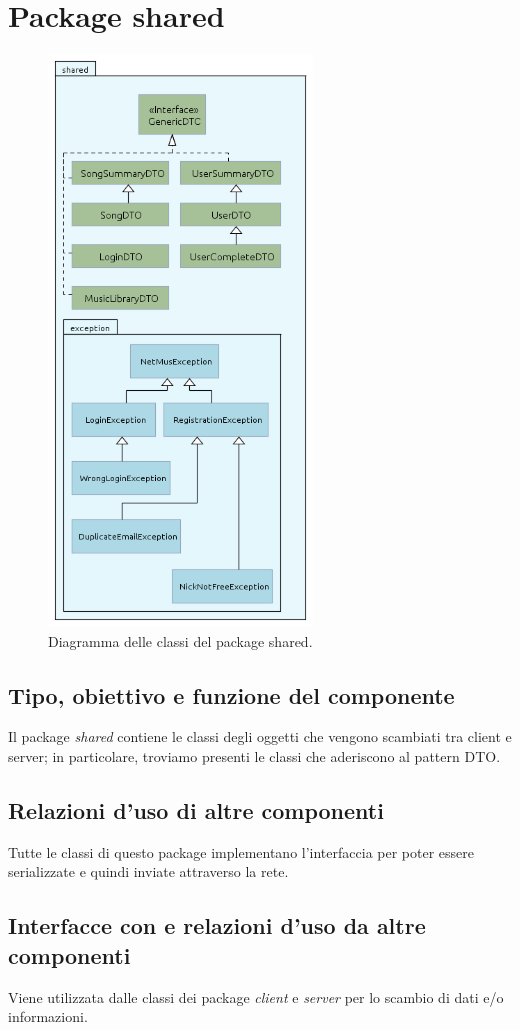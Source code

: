 \section{Package shared} %
\begin{figure}[h]
  \centering
  \includegraphics[width=7cm]{img/ST/Shared.png}
\caption{Diagramma delle classi del package shared.}
\end{figure}
\subsection*{Tipo, obiettivo e funzione del componente}
Il package \emph{shared} contiene le classi degli oggetti che vengono
scambiati tra client e server; in particolare, troviamo presenti le classi che
aderiscono al pattern DTO.
\subsection*{Relazioni d'uso di altre componenti}
Tutte le classi di questo package implementano l'interfaccia
 per poter essere serializzate e quindi inviate
attraverso la rete. 
\subsection*{Interfacce con e relazioni d'uso da altre componenti}
Viene utilizzata dalle classi dei package \emph{client} e \emph{server} per
lo scambio di dati e/o informazioni.
